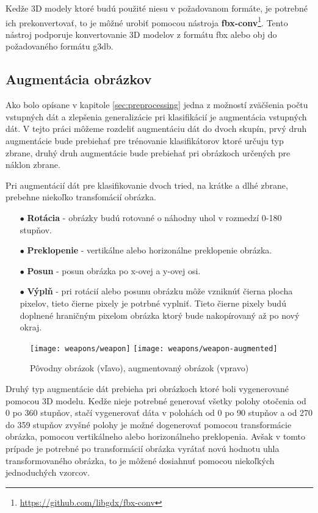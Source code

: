 Kedže 3D modely ktoré budú použité niesu v požadovanom formáte, je potrebné ich prekonvertovať, to je môžné urobiť
    pomocou nástroja \textbf{fbx-conv}\footnote{\url{https://github.com/libgdx/fbx-conv}}.
Tento nástroj podporuje konvertovanie 3D modelov z formátu fbx alebo obj do požadovaného formátu g3db.

\subsection{Augmentácia obrázkov}
\label{subsec:augmentacia}
Ako bolo opísane v kapitole \ref{sec:preprocessing} jedna z možností zväčšenia počtu vstupných dát a zlepšenia generalizácie pri klasifikácií je augmentácia vstupných dát.
V tejto práci môžeme rozdeliť augmentáciu dát do dvoch skupín, prvý druh augmentácie bude prebiehať pre trénovanie klasifikátorov ktoré
    určuju typ zbrane, druhý druh augmentácie bude prebiehať pri obrázkoch určených pre náklon zbrane.

Pri augmentácií dát pre klasifikovanie dvoch tried, na krátke a dlhé zbrane, prebehne niekoľko transfomácií obrázka.
\begin{enumerate}
    \item[$\bullet$] \textbf{Rotácia} - obrázky budú rotované o náhodny uhol v rozmedzí 0-180 stupňov.
    \item[$\bullet$] \textbf{Preklopenie} - vertikálne alebo horizonálne preklopenie obrázka.
    \item[$\bullet$] \textbf{Posun} - posun obrázka po x-ovej a y-ovej osi.
    \item[$\bullet$] \textbf{Výplň} - pri rotácií alebo posunu obrázku môže vzniknúť čierna plocha pixelov, tieto čierne pixely je potrbné vyplniť.
    Tieto čierne pixely budú doplnené hraničným pixelom obrázka ktorý bude nakopírovaný až po nový okraj.
\end{enumerate}

\begin{figure}[H]
    \centering
    \texttt{[image: weapons/weapon]}
    \qquad
    \texttt{[image: weapons/weapon-augmented]}
    \caption{Pôvodny obrázok (vľavo), augmentovaný obrázok (vpravo)}
    \label{pic:imageAugmented}
\end{figure}

Druhý typ augmentácie dát prebieha pri obrázkoch ktoré boli vygenerované pomocou 3D modelu.
Kedže nieje potrebné generovať všetky polohy otočenia od 0 po 360 stupňov, stačí vygenerovať dáta v polohách od 0 po 90 stupňov a od 270 do 359 stupňov
    zvyšné polohy je možné dogenerovať pomocou transformácie obrázka, pomocou vertikálneho alebo horizonálneho preklopenia.
Avšak v tomto prípade je potrebné po transformácií obrázka vyrátať novú hodnotu uhla transformovaného obrázka, to je môžené dosiahnuť pomocou niekoľkých
    jednoduchých vzorcov.

